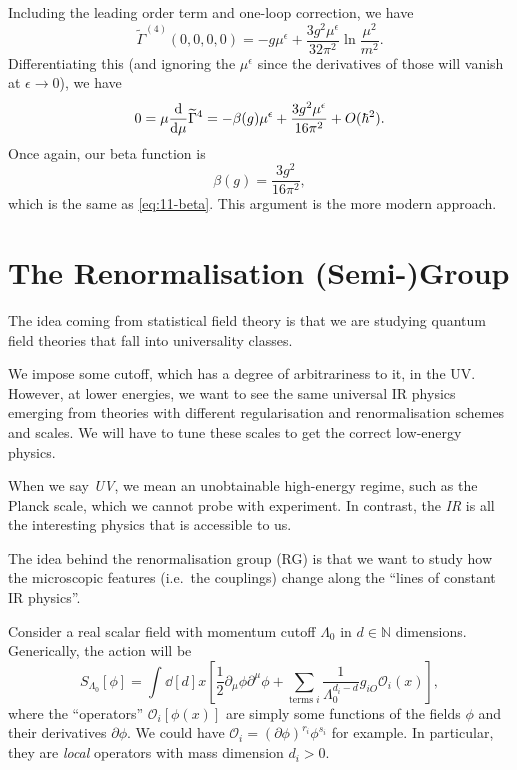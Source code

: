 Including the  leading order term and one-loop correction, we have
\begin{equation}
  \widetilde{\Gamma}^{(4)}(0,0,0,0) = - g \mu^\epsilon + \frac{3 g^2 \mu^\epsilon}{32 \pi^2} \ln \frac{\mu^2}{m^2}.
\end{equation}
Differentiating this (and ignoring the $\mu^\epsilon$ since the derivatives of those will vanish at $\epsilon \to 0$), we have
\begin{equation}
  0 = \mu \dv{\mu} \widetilde{\Gamma}^4 = - \beta(g) \mu^\epsilon + \frac{3 g^2 \mu^\epsilon}{16 \pi^2} + O(\hbar^2).
\end{equation}
Once again, our beta function is
\begin{equation}
  \beta(g) = \frac{3 g^2}{16 \pi^2},
\end{equation}
which is the same as \eqref{eq:11-beta}.
This argument is the more modern approach.

\chapter{The Renormalisation (Semi-)Group}%
\label{cha:the_renormalisation_semi_group}

The idea coming from statistical field theory is that we are studying quantum field theories that fall into universality classes.

We impose some cutoff, which has a degree of arbitrariness to it, in the UV. However, at lower energies, we want to see the same universal IR physics emerging from theories with different regularisation and renormalisation schemes and scales.
We will have to tune these scales to get the correct low-energy physics.

\begin{remark}
  When we say \emph{UV}, we mean an unobtainable high-energy regime, such as the Planck scale, which we cannot probe with experiment.
  In contrast, the \emph{IR} is all the interesting physics that is accessible to us.
\end{remark}

The idea behind the renormalisation group (RG) is that we want to study how the microscopic features (i.e.~the couplings) change along the ``lines of constant IR physics''.

Consider a real scalar field with momentum cutoff $\Lambda_0$ in $d \in \mathbb{N}$ dimensions.
Generically, the action will be
\begin{equation}
  S_{\Lambda_0} [\phi] = \int_{}^{}\dd[d]{x} \left[ \frac{1}{2} \partial_{\mu} \phi \partial^{\mu} \phi + \sum_{\text{terms } i} \frac{1}{\Lambda_0^{d_i - d}} g_{iO} \mathcal{O}_i(x) \right],
\end{equation}
where the ``operators'' $\mathcal{O}_i[\phi(x)]$ are simply some functions of the fields $\phi$ and their derivatives $\partial \phi$.
We could have $ \mathcal{O}_i = (\partial \phi)^{r_i} \phi^{s_i}$ for example.
 In particular, they are \emph{local} operators with mass dimension $d_i > 0$. 

